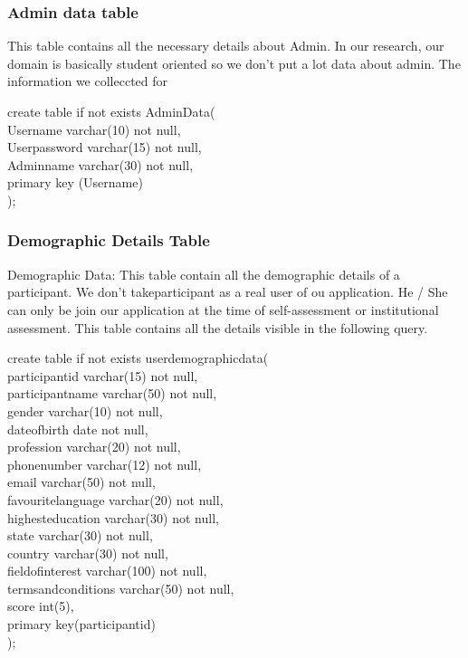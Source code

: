 \documentclass[10pt,a4paper,openright]{IEEEtran}
\begin{document}
\subsubsection{Admin data table}
This table contains all the necessary details about Admin. In our research, our domain is basically student oriented so we don't put a lot data about admin. The information we colleccted for   
\begin{tcolorbox}
create table if not exists AdminData( \\
Username varchar(10) not null,\\
Userpassword varchar(15) not null,
\\Adminname  varchar(30) not null,
\\primary key (Username)
\\);
\end{tcolorbox}
\subsubsection{Demographic Details Table}
Demographic Data: This table contain all the demographic details of a participant. We don’t takeparticipant as a real user of ou application. He / She can only be join our application at the time of self-assessment or institutional assessment. This table contains all the details visible in the following query.
\begin{tcolorbox}
     create table if not exists userdemographicdata(\\ participantid varchar(15) not null, \\participantname varchar(50) not null,\\ gender varchar(10) not null,\\ dateofbirth date not null,\\ profession varchar(20) not null,\\ phonenumber varchar(12) not null,\\ email varchar(50) not null,\\ favouritelanguage varchar(20) not null, \\highesteducation varchar(30) not null, \\ state varchar(30) not null,\\ country varchar(30) not null, \\ fieldofinterest varchar(100) not null,\\ termsandconditions varchar(50) not null,\\ score int(5),\\ primary key(participantid)\\);
\end{tcolorbox}
\end{document}
